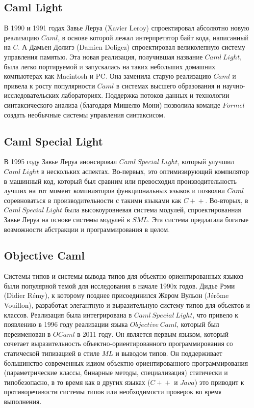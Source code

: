 \documentclass[14pt]{matmex-diploma-custom}
\begin{document}
\subsection{Caml Light}
В 1990 и 1991 годах Завье Леруа (Xavier Leroy) спроектировал абсолютно новую реализацию $Caml$, в основе которой лежал интерпретатор байт кода, написанный на $C$. А Дамьен Долигэ (Damien Doligez) спроектировал великолепную систему управления памятью. Эта новая реализация, получившая название $Caml\ Light$, была легко портируемой и запускалась на таких небольших домашних компьютерах как Macintosh и PC. Она заменила старую реализацию $Caml$ и привела к росту популярности $Caml$ в системах высшего образования и научно-исследовательских лабораториях. Поддержка потоков данных и технологии синтаксического анализа (благодаря Мишелю Мони) позволила команде $Formel$ создать необычные системы управления синтаксисом. 

\subsection{Caml Special Light}
В 1995 году Завье Леруа анонсировал $Caml\ Special\ Light$, который улучшил $Caml\ Light$ в нескольких аспектах. Во-первых, это оптимизирующий компилятор в машинный код, который был сравним или превосходил производительность лучших на тот момент компиляторов функциональных языков и позволил $Caml$ соревноваться в производительности с  такими языками как $C\!+\!+$. Во-вторых, в $Caml\ Special\ Light$ была высокоуровневая система модулей, спроектированная Завье Леруа на основе системы модулей в $S\!M\!L$. Эта система предлагала богатые возможности абстракции и программирования в целом. 

\subsection{Objective Caml}
Системы типов и системы вывода типов для объектно-ориентированных языков были популярной темой для исследования в начале 1990х годов. Дидье Рэми (Didier Rémy), к которому позднее присоединился Жером Вульон (Jérôme Vouillon), разработал элегантную и выразительную систему типов для объектов и классов. Реализация была интегрирована в 
$Caml\ Special\ Light$, что привело к появлению в 1996 году реализации языка $Objective\ Caml$, который был переименован в $OCaml$ в 2011 году. Он является первым языком, который сочетает выразительность объектно-ориентированного программирования со статической типизацией в стиле $M\!L$ и выводом типов.  Он поддерживает большинство современных идиом объектно-ориентированного программирования (параметрические классы, бинарные методы, специализация) статически и типобезопасно, в то время как в других языках ($C\!+\!+$ и $Java$) это приводит к противоречивости системы типов или необходимости проверок во время выполнения.
\end{document}
